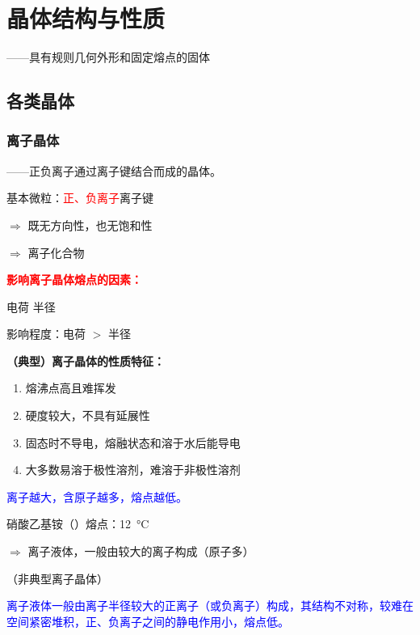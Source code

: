 \chapter{晶体结构与性质} \label{chap:晶体结构与性质}

    ——具有规则几何外形和固定熔点的固体

    \section{各类晶体}\label{sect:各类晶体}

        \subsection{离子晶体}\label{subsec:离子晶体}

            ——正负离子通过离子键结合而成的晶体。

            基本微粒：\textcolor{red}{正、负离子}\qquad 离子键

            \(\Rightarrow\) 既无方向性，也无饱和性

            \(\Rightarrow\) 离子化合物

            \textbf{\textcolor{red}{影响离子晶体熔点的因素：}}

             电荷\quad {} 半径

            影响程度：电荷 \(>\) 半径

            \textbf{（典型）离子晶体的性质特征：}

            \begin{enumerate}
                \item 熔沸点高且难挥发
                \item 硬度较大，不具有延展性
                \item 固态时不导电，熔融状态和溶于水后能导电
                \item 大多数易溶于极性溶剂，难溶于非极性溶剂
            \end{enumerate}

            \textcolor{blue}{离子越大，含原子越多，熔点越低。}

            硝酸乙基铵（）熔点：\SI{12}{\degreeCelsius}

            \(\Rightarrow\) 离子液体，一般由较大的离子构成（原子多）

            （非典型离子晶体）

            \textcolor{blue}{离子液体一般由离子半径较大的正离子（或负离子）构成，其结构不对称，较难在空间紧密堆积，正、负离子之间的静电作用小，熔点低。}

